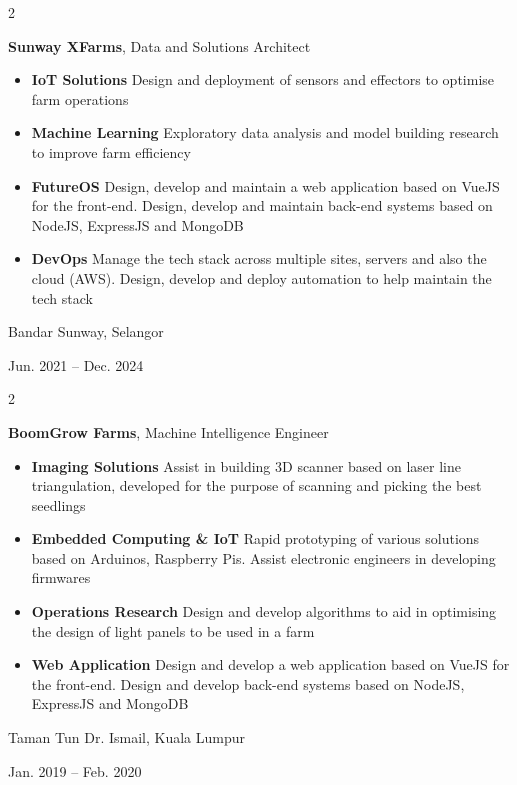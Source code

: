 \documentclass[10pt, letterpaper]{article}
\newenvironment{highlights}{
    \begin{itemize}[
        topsep=0.10 cm,
        parsep=0.10 cm,
        partopsep=0pt,
        itemsep=0pt,
        leftmargin=0.4 cm + 10pt
    ]
}{
    \end{itemize}
} %
\newenvironment{twocolentry}[2][]{
    \onecolentry
    \def\secondColumn{#2}
    \setcolumnwidth{\fill, 4.5 cm}
    \begin{paracol}{2}
}{
    \switchcolumn \raggedleft \secondColumn
    \end{paracol}
    \endonecolentry
} %
\begin{document}
        \begin{twocolentry}{
            Bandar Sunway, Selangor

        Jun. 2021 – Dec. 2024
        }
            \textbf{Sunway XFarms}, Data and Solutions Architect
            \begin{highlights}
                \item \textbf{IoT Solutions} Design and deployment of sensors and effectors to optimise farm operations
                \item \textbf{Machine Learning} Exploratory data analysis and model building research to improve farm efficiency
                \item \textbf{FutureOS} Design, develop and maintain a web application based on VueJS for the front-end. 
                    Design, develop and maintain back-end systems based on NodeJS, ExpressJS and MongoDB
                \item \textbf{DevOps} Manage the tech stack across multiple sites, servers and also the cloud (AWS). 
                    Design, develop and deploy automation to help maintain the tech stack
            \end{highlights}
        \end{twocolentry}
        
        \begin{twocolentry}{
            Taman Tun Dr. Ismail, Kuala Lumpur

        Jan. 2019 – Feb. 2020
        }
            \textbf{BoomGrow Farms}, Machine Intelligence Engineer
            \begin{highlights}
                \item \textbf{Imaging Solutions} Assist in building 3D scanner based on laser line triangulation, 
                    developed for the purpose of scanning and picking the best seedlings
                \item \textbf{Embedded Computing \& IoT} Rapid prototyping of various solutions based on Arduinos, Raspberry Pis.
                     Assist electronic engineers in developing firmwares
                \item \textbf{Operations Research} Design and develop algorithms to aid in optimising the design of light panels to be used in a farm
                \item \textbf{Web Application} Design and develop a web application based on VueJS for the front-end.
                     Design and develop back-end systems based on NodeJS, ExpressJS and MongoDB
            \end{highlights}
        \end{twocolentry}
\end{document}

